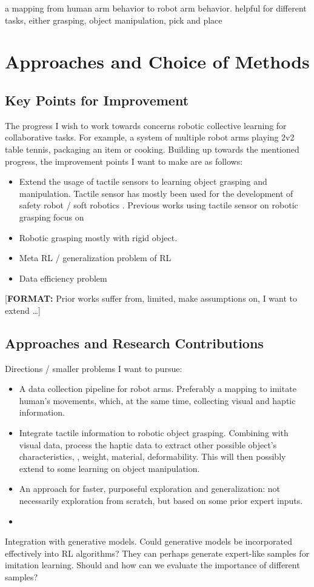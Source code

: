 a mapping from human arm behavior to robot arm behavior. helpful for different tasks, either grasping, object manipulation, pick and place

\section{Approaches and Choice of Methods}
\subsection{Key Points for Improvement}
The progress I wish to work towards concerns robotic collective learning for collaborative tasks. For example, a system of multiple robot arms playing 2v2 table tennis, packaging an item or cooking. Building up towards the mentioned progress, the improvement points I want to make are as follows:

\begin{itemize}
	\item Extend the usage of tactile sensors to learning object grasping and manipulation. Tactile sensor has mostly been used for the development of safety robot / soft robotics \cite{haddadin2018tactile}. Previous works using tactile sensor on robotic grasping focus on 
	\item Robotic grasping mostly with rigid object.
	\item Meta \ac{RL} / generalization problem of \ac{RL}
	\item Data efficiency problem
\end{itemize}

[\textbf{FORMAT:} Prior works suffer from, limited, make assumptions on, I want to extend \dots]

\subsection{Approaches and Research Contributions}
Directions / smaller problems I want to pursue:

\begin{itemize}
	\item A data collection pipeline for robot arms. Preferably a mapping to imitate human’s movements, which, at the same time, collecting visual and haptic information.
	\item Integrate tactile information to robotic object grasping. Combining with visual data, process the haptic data to extract other possible object's characteristics, \eg, weight, material, deformability.
	This will then possibly extend to some learning on object manipulation.
	\item An approach for faster, purposeful exploration and generalization: not necessarily exploration from scratch, but based on some prior expert inputs.
	\item 
\end{itemize}
Integration with generative models. Could generative models be incorporated effectively into RL algorithms? They can perhaps generate expert-like samples for imitation learning. Should and how can we evaluate the importance of different samples?

